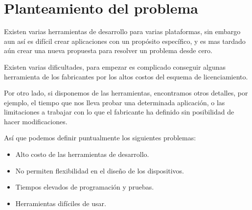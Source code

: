 \section{Planteamiento del problema}\label{sec:problem}

Existen varias herramientas de desarrollo para varias plataformas,
sin embargo aun así es difícil crear aplicaciones con un propósito
específico, y es mas tardado aún crear una nueva propuesta para resolver
un problema desde cero.

Existen varias dificultades, para empezar es complicado conseguir
algunas herramienta de los fabricantes por los altos costos del esquema
de licenciamiento.

Por otro lado, si disponemos de las herramientas, encontramos otros
detalles, por ejemplo, el tiempo que nos lleva probar una determinada
aplicación, o las limitaciones a trabajar con lo que el fabricante
ha definido sin posibilidad de hacer modificaciones.

Así que podemos definir puntualmente los siguientes problemas:

\begin{itemize}
\item Alto costo de las herramientas de desarrollo.
\item No permiten flexibilidad en el diseño de los dispositivos.
\item Tiempos elevados de programación y pruebas.
\item Herramientas difíciles de usar.
\end{itemize}

